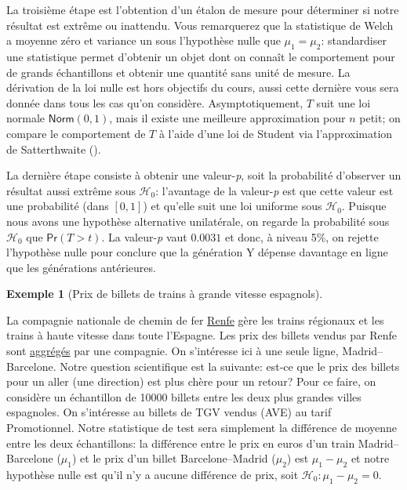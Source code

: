 \documentclass[
  11pt,
  letterpaper,
]{scrbook}
\theoremstyle{definition}
\newtheorem{example}{Exemple}[chapter]
\theoremstyle{definition}
\theoremstyle{remark}
\begin{document}
La troisième étape est l'obtention d'un étalon de mesure pour déterminer
si notre résultat est extrême ou inattendu. Vous remarquerez que la
statistique de Welch a moyenne zéro et variance un sous l'hypothèse
nulle que \(\mu_1=\mu_2\): standardiser une statistique permet d'obtenir
un objet dont on connaît le comportement pour de grands échantillons et
obtenir une quantité sans unité de mesure. La dérivation de la loi nulle
est hors objectifs du cours, aussi cette dernière vous sera donnée dans
tous les cas qu'on considère. Asymptotiquement, \(T\) suit une loi
normale \(\mathsf{Norm}(0, 1)\), mais il existe une meilleure
approximation pour \(n\) petit; on compare le comportement de \(T\) à
l'aide d'une loi de Student via l'approximation de Satterthwaite
().

La dernière étape consiste à obtenir une valeur-\emph{p}, soit la
probabilité d'observer un résultat aussi extrême sous \(\mathscr{H}_0\):
l'avantage de la valeur-\emph{p} est que cette valeur est une
probabilité (dans \([0, 1]\)) et qu'elle suit une loi uniforme sous
\(\mathscr{H}_0\). Puisque nous avons une hypothèse alternative
unilatérale, on regarde la probabilité sous \(\mathscr{H}_0\) que
\(\mathsf{Pr}(T > t)\). La valeur-\emph{p} vaut \(0.0031\) et donc, à
niveau 5\%, on rejette l'hypothèse nulle pour conclure que la génération
Y dépense davantage en ligne que les générations antérieures.

\begin{example}[Prix de billets de trains à grande vitesse
espagnols]\protect\hypertarget{exm-prix-trains-tests}{}\label{exm-prix-trains-tests}

La compagnie nationale de chemin de fer
\href{https://www.renfe.com/}{Renfe} gère les trains régionaux et les
trains à haute vitesse dans toute l'Espagne. Les prix des billets vendus
par Renfe sont
\href{https://www.kaggle.com/thegurusteam/spanish-high-speed-rail-system-ticket-pricing}{aggrégés}
par une compagnie. On s'intéresse ici à une seule ligne,
Madrid--Barcelone. Notre question scientifique est la suivante: est-ce
que le prix des billets pour un aller (une direction) est plus chère
pour un retour? Pour ce faire, on considère un échantillon de 10000
billets entre les deux plus grandes villes espagnoles. On s'intéresse au
billets de TGV vendus (AVE) au tarif Promotionnel. Notre statistique de
test sera simplement la différence de moyenne entre les deux
échantillons: la différence entre le prix en euros d'un train
Madrid--Barcelone (\(\mu_1\)) et le prix d'un billet Barcelone--Madrid
(\(\mu_2\)) est \(\mu_1-\mu_2\) et notre hypothèse nulle est qu'il n'y a
aucune différence de prix, soit \(\mathscr{H}_0: \mu_1-\mu_2=0\).

\end{example}
\end{document}
